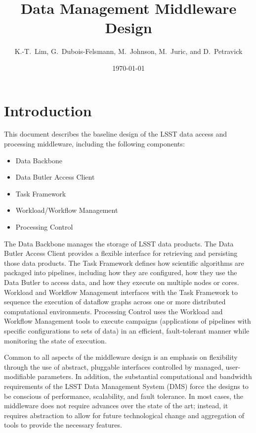 \documentclass[DM,lsstdraft,toc]{lsstdoc}
\title{Data Management Middleware Design}
\author{
	K.-T.~Lim,
	G.~Dubois-Felsmann,
	M.~Johnson,
	M.~Juric,
	and
	D.~Petravick
}
\date{\today}
\begin{document}
\maketitle

\section{Introduction}\label{introduction}

This document describes the baseline design of the LSST data access and
processing middleware, including the following components:

\begin{itemize}
	\item Data Backbone
	\item Data Butler Access Client
	\item Task Framework
	\item Workload/Workflow Management
	\item Processing Control
\end{itemize}

The Data Backbone manages the storage of LSST data products.  The Data Butler
Access Client provides a flexible interface for retrieving and persisting those
data products.  The Task Framework defines how scientific algorithms are
packaged into pipelines, including how they are configured, how they use the
Data Butler to access data, and how they execute on multiple nodes or cores.
Workload and Workflow Management interfaces with the Task Framework to sequence
the execution of dataflow graphs across one or more distributed computational
environments.  Processing Control uses the Workload and Workflow Management
tools to execute campaigns (applications of pipelines with specific
configurations to sets of data) in an efficient, fault-tolerant manner while
monitoring the state of execution.

Common to all aspects of the middleware design is an emphasis on
flexibility through the use of abstract, pluggable interfaces controlled
by managed, user-modifiable parameters. In addition, the substantial
computational and bandwidth requirements of the LSST Data Management
System (DMS) force the designs to be conscious of performance,
scalability, and fault tolerance. In most cases, the middleware does not
require advances over the state of the art; instead, it requires
abstraction to allow for future technological change and aggregation of
tools to provide the necessary features.
\end{document}
